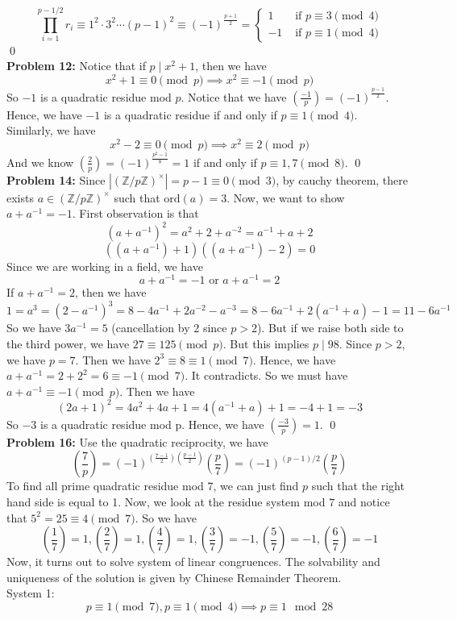 \documentclass[12pt]{amsart}
\newcommand{\Z}{\mathbb{Z}}
\newcommand{\ord}{\mathrm{ord}}
\begin{document}
\[\prod_{i=1}^{p-1/2}r_i\equiv 1^2\cdot 3^2\cdots (p-1)^2\equiv (-1)^{\frac{p+1}{2}}=\begin{cases}
    1 & \text{ if }p\equiv 3\pmod 4\\ 
    -1 & \text{ if }p\equiv 1\pmod 4 
\end{cases}\]
\qed\\
\textbf{Problem 12:} Notice that if $p\mid x^2+1$, then we have 
\[x^2+1\equiv 0\pmod p \implies x^2\equiv -1\pmod p\]
So $-1$ is a quadratic residue mod $p$. Notice that we have $(\frac{-1}{p})=(-1)^{\frac{p-1}{2}}$. Hence, we have $-1$ is a quadratic residue if and only if $p\equiv 1\pmod 4$. \\
Similarly, we have 
\[x^2-2\equiv 0\pmod p \implies x^2\equiv 2\pmod p\]
And we know $(\frac{2}{p})=(-1)^{\frac{p^2-1}{8}}=1$ if and only if $p\equiv 1, 7\pmod 8$.
\qed\\
\textbf{Problem 14:} Since $|(\Z/p\Z)^\times |=p-1\equiv 0\pmod 3$, by cauchy theorem, there exists $a\in (\Z/p\Z)^\times$ such that $\ord(a)=3$. Now, we want to show $a+a^{-1}=-1$. First observation is that 
\[(a+a^{-1})^2=a^2+2+a^{-2}=a^{-1}+a+2\]
\[((a+a^{-1})+1)((a+a^{-1})-2)=0\]
Since we are working in a field, we have 
\[a+a^{-1}=-1 \text{ or } a+a^{-1}=2\]
If $a+a^{-1}=2$, then we have 
\[1=a^3=(2-a^{-1})^3=8-4a^{-1}+2a^{-2}-a^{-3}=8-6a^{-1}+2(a^{-1}+a)-1=11-6a^{-1}\]
So we have $3a^{-1}=5$ (cancellation by 2 since $p>2$). But if we raise both side to the third power, we have $27\equiv 125 \pmod p$. But this implies $p\mid 98$. Since $p>2$, we have $p=7$. Then we have $2^3\equiv 8\equiv 1\pmod 7$. Hence, we have $a+a^{-1}=2+2^2=6\equiv -1\pmod 7$. It contradicts. So we must have $a+a^{-1}\equiv -1\pmod p$. Then we have 
\[(2a+1)^2=4a^2+4a+1=4(a^{-1}+a)+1=-4+1=-3\]
So $-3$ is a quadratic residue mod p. Hence, we have $(\frac{-3}{p})=1$.
\qed\\
\textbf{Problem 16:} Use the quadratic reciprocity, we have 
\[(\frac{7}{p})=(-1)^{(\frac{7-1}{2})(\frac{p-1}{2})}(\frac{p}{7})=(-1)^{(p-1)/2}(\frac{p}{7})\]
To find all prime quadratic residue mod 7, we can just find $p$ such that the right hand side is equal to 1. Now, we look at the residue system mod $7$ and notice that $5^2=25\equiv 4\pmod 7$. So we have
\[(\frac{1}{7})=1,(\frac{2}{7})=1,(\frac{4}{7})=1,(\frac{3}{7})=-1,(\frac{5}{7})=-1,(\frac{6}{7})=-1\]
Now, it turns out to solve system of linear congruences. The solvability and uniqueness of the solution is given by Chinese Remainder Theorem.\\
System 1: 
\[p\equiv 1 \pmod 7, p\equiv 1\pmod 4\implies p\equiv 1\mod 28\]
\end{document}
